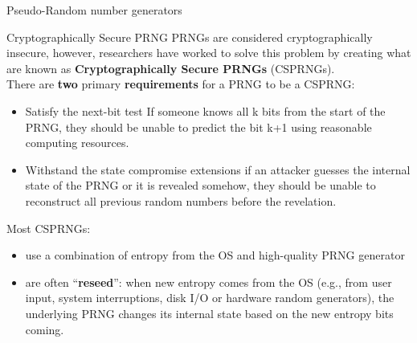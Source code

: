 \begin{section}{Pseudo-Random number generators}
  \begin{subsection}{Cryptographically Secure PRNG}
    PRNGs are considered cryptographically insecure, however, researchers have worked to solve this
    problem by creating what are known as \textbf{Cryptographically Secure PRNGs} (CSPRNGs).\\
    There are \textbf{two} primary \textbf{requirements} for a PRNG to be a CSPRNG:
    \begin{itemize}
    \item Satisfy the next-bit test
      \subitem If someone knows all k bits from the start of the PRNG, they should be unable to predict the bit k+1 using reasonable computing resources.
    \item Withstand the state compromise extensions
      \subitem if an attacker guesses the internal state of the PRNG or it is revealed somehow, they
        should be unable to reconstruct all previous random numbers before the revelation.
    \end{itemize}

    Most CSPRNGs:
    \begin{itemize}
      \item use a combination of entropy from the OS and high-quality PRNG generator
      \item are often “\textbf{reseed}”: when new entropy comes from the OS (e.g., from user input,
        system interruptions, disk I/O or hardware random generators), the underlying PRNG changes
        its internal state based on the new entropy bits coming.
    \end{itemize}
  \end{subsection}


\end{section}
